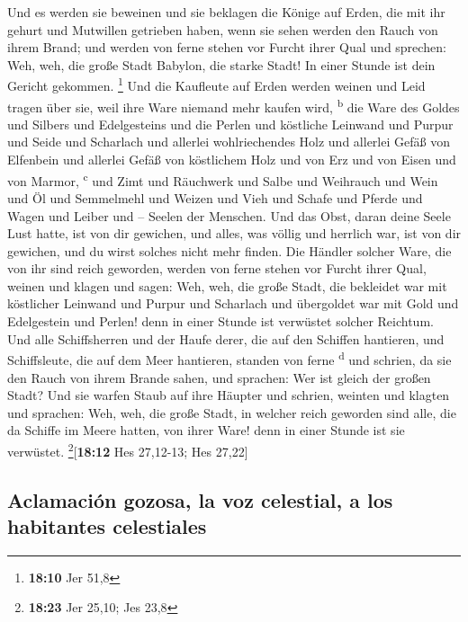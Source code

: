 Und es werden sie beweinen und sie beklagen die Könige
auf Erden, die mit ihr gehurt und Mutwillen getrieben haben, wenn sie
sehen werden den Rauch von ihrem Brand;  und werden von
ferne stehen vor Furcht ihrer Qual und sprechen: Weh, weh, die große
Stadt Babylon, die starke Stadt! In einer Stunde ist dein Gericht
gekommen. \footnote{\textbf{18:10} Jer 51,8}  Und die
Kaufleute auf Erden werden weinen und Leid tragen über sie, weil ihre
Ware niemand mehr kaufen wird, \textsuperscript{b}  die
Ware des Goldes und Silbers und Edelgesteins und die Perlen und
köstliche Leinwand und Purpur und Seide und Scharlach und allerlei
wohlriechendes Holz und allerlei Gefäß von Elfenbein und allerlei Gefäß
von köstlichem Holz und von Erz und von Eisen und von Marmor,
\textsuperscript{c}  und Zimt und Räuchwerk und Salbe und
Weihrauch und Wein und Öl und Semmelmehl und Weizen und Vieh und Schafe
und Pferde und Wagen und Leiber und -- Seelen der Menschen.
 Und das Obst, daran deine Seele Lust hatte, ist von dir
gewichen, und alles, was völlig und herrlich war, ist von dir gewichen,
und du wirst solches nicht mehr finden.  Die Händler
solcher Ware, die von ihr sind reich geworden, werden von ferne stehen
vor Furcht ihrer Qual, weinen und klagen  und sagen: Weh,
weh, die große Stadt, die bekleidet war mit köstlicher Leinwand und
Purpur und Scharlach und übergoldet war mit Gold und Edelgestein und
Perlen!  denn in einer Stunde ist verwüstet solcher
Reichtum. Und alle Schiffsherren und der Haufe derer, die auf den
Schiffen hantieren, und Schiffsleute, die auf dem Meer hantieren,
standen von ferne \textsuperscript{d}  und schrien, da
sie den Rauch von ihrem Brande sahen, und sprachen: Wer ist gleich der
großen Stadt?  Und sie warfen Staub auf ihre Häupter und
schrien, weinten und klagten und sprachen: Weh, weh, die große Stadt, in
welcher reich geworden sind alle, die da Schiffe im Meere hatten, von
ihrer Ware! denn in einer Stunde ist sie verwüstet.
\footnote{\textbf{18:23} Jer 25,10; Jes 23,8}{[}\textbf{18:12} Hes
27,12-13; Hes 27,22{]}

\hypertarget{aclamaciuxf3n-gozosa-la-voz-celestial-a-los-habitantes-celestiales}{%
\subsection{Aclamación gozosa, la voz celestial, a los habitantes
celestiales}\label{aclamaciuxf3n-gozosa-la-voz-celestial-a-los-habitantes-celestiales}}


